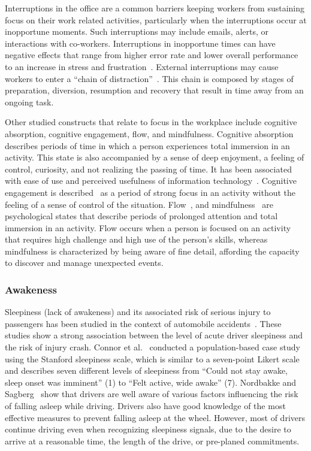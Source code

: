 Interruptions in the office are a common barriers keeping workers from sustaining focus on their work related activities, particularly when the interruptions occur at inopportune moments.
Such interruptions may include emails, alerts, or interactions with co-workers\cite{gonzalez2004constant,chong2006interruptions,shamsi07}. Interruptions in inopportune times can have negative effects that range from higher error rate and lower overall performance
to an increase in stress and frustration~\cite{bailey2001effects,czerwinski2000instant,mark2008cost}.
External interruptions may cause workers to enter a ``chain of distraction''~\cite{shamsi07}.
This chain is composed by stages of preparation, diversion, resumption and recovery that result in time away from an ongoing task. 

Other studied constructs that relate to focus in the workplace include cognitive absorption, cognitive engagement, flow, and mindfulness.
Cognitive absorption describes periods of time in which a person experiences total immersion in an activity.
This state is also accompanied by a sense of deep enjoyment, a feeling of control, curiosity, and not realizing the passing of time.
It has been associated with ease of use and perceived usefulness of information technology~\cite{agarwal00}.
Cognitive engagement is described~\cite{webster97} as a period of strong focus in an activity without the feeling of a sense of control of the situation.
Flow~\cite{Csikszentmihalyi90}, and mindfulness~\cite{Weick06,dane11} are psychological states that describe periods of prolonged attention and total immersion in an activity. Flow occurs when a person is focused on an activity that requires high challenge and high use of the person's skills, whereas mindfulness is characterized by being aware of fine detail, affording the capacity to discover and manage unexpected events.

\subsubsection{Awakeness}

Sleepiness (lack of awakeness) and its associated risk of serious injury to passengers has been studied in the context of automobile 
accidents~\cite{connor02,Nordbakke07}.
These studies show a strong association between the level of acute driver sleepiness and the risk of injury crash.
Connor et al.~\cite{connor02} conducted a population-based case study using the Stanford sleepiness scale, which is similar to a seven-point Likert scale and describes seven different levels of sleepiness from ``Could not stay awake, sleep onset was imminent'' (1) to ``Felt active, wide awake'' (7).
Nordbakke and Sagberg~\cite{Nordbakke07} show that drivers are well aware of  various factors influencing the risk of falling asleep while driving. Drivers also have good knowledge of the most effective measures to prevent falling asleep at the wheel.
However, most of drivers continue driving even when recognizing sleepiness signals, due to the desire to arrive at a reasonable time, the length of the drive, or pre-planed commitments.


